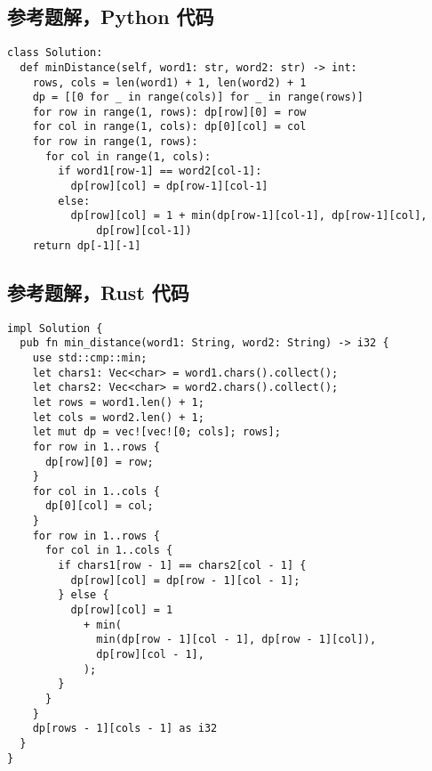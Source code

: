 \subsection{参考题解，Python 代码}

\begin{verbatim}
class Solution:
  def minDistance(self, word1: str, word2: str) -> int:
    rows, cols = len(word1) + 1, len(word2) + 1
    dp = [[0 for _ in range(cols)] for _ in range(rows)]
    for row in range(1, rows): dp[row][0] = row
    for col in range(1, cols): dp[0][col] = col
    for row in range(1, rows):
      for col in range(1, cols):
        if word1[row-1] == word2[col-1]:
          dp[row][col] = dp[row-1][col-1]
        else:
          dp[row][col] = 1 + min(dp[row-1][col-1], dp[row-1][col],
              dp[row][col-1])
    return dp[-1][-1]
\end{verbatim}

\subsection{参考题解，Rust 代码}

\begin{verbatim}
impl Solution {
  pub fn min_distance(word1: String, word2: String) -> i32 {
    use std::cmp::min;
    let chars1: Vec<char> = word1.chars().collect();
    let chars2: Vec<char> = word2.chars().collect();
    let rows = word1.len() + 1;
    let cols = word2.len() + 1;
    let mut dp = vec![vec![0; cols]; rows];
    for row in 1..rows {
      dp[row][0] = row;
    }
    for col in 1..cols {
      dp[0][col] = col;
    }
    for row in 1..rows {
      for col in 1..cols {
        if chars1[row - 1] == chars2[col - 1] {
          dp[row][col] = dp[row - 1][col - 1];
        } else {
          dp[row][col] = 1
            + min(
              min(dp[row - 1][col - 1], dp[row - 1][col]),
              dp[row][col - 1],
            );
        }
      }
    }
    dp[rows - 1][cols - 1] as i32
  }
}
\end{verbatim}
